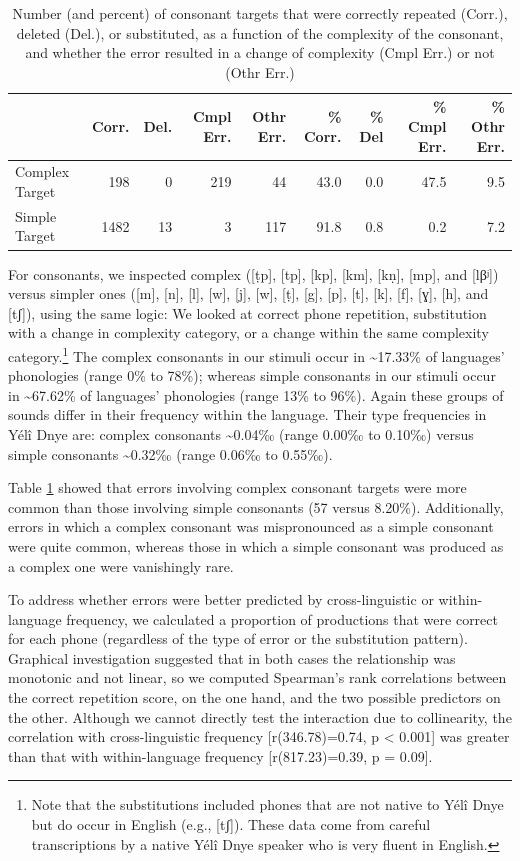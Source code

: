 \documentclass[
  american,
  ,man,floatsintext]{apa6}
\begin{document}
\begin{table}

\caption{\label{tab:tab-c}Number (and percent) of consonant targets that were correctly repeated (Corr.), deleted (Del.), or substituted, as a function of the complexity of the consonant, and whether the error resulted in a change of complexity (Cmpl Err.) or not (Othr Err.)}
\centering
\begin{tabular}[t]{lrrrrrrrr}
\toprule
  & Corr. & Del. & Cmpl Err. & Othr Err. & \% Corr. & \% Del & \% Cmpl Err. & \% Othr Err.\\
\midrule
Complex Target & 198 & 0 & 219 & 44 & 43.0 & 0.0 & 47.5 & 9.5\\
Simple Target & 1482 & 13 & 3 & 117 & 91.8 & 0.8 & 0.2 & 7.2\\
\bottomrule
\end{tabular}
\end{table}

For consonants, we inspected complex ({[}ṭp{]}, {[}tp{]}, {[}kp{]}, {[}km{]}, {[}kṇ{]}, {[}mp{]}, and {[}lβʲ{]}) versus simpler ones ({[}m{]}, {[}n{]}, {[}l{]}, {[}w{]}, {[}j{]}, {[}w{]}, {[}ṭ{]}, {[}g{]}, {[}p{]}, {[}t{]}, {[}k{]}, {[}f{]}, {[}ɣ{]}, {[}h{]}, and {[}tʃ{]}), using the same logic: We looked at correct phone repetition, substitution with a change in complexity category, or a change within the same complexity category.\footnote{Note that the substitutions included phones that are not native to Yélî Dnye but do occur in English (e.g., {[}tʃ{]}). These data come from careful transcriptions by a native Yélî Dnye speaker who is very fluent in English.}
The complex consonants in our stimuli occur in \textasciitilde17.33\% of languages' phonologies (range 0\% to 78\%);
whereas simple consonants in our stimuli occur in \textasciitilde67.62\% of languages' phonologies (range 13\% to 96\%).
Again these groups of sounds differ in their frequency within the language. Their type frequencies in Yélî Dnye are: complex consonants \textasciitilde0.04‰ (range 0.00‰ to 0.10‰) versus simple consonants \textasciitilde0.32‰ (range 0.06‰ to 0.55‰).

Table \ref{tab:tab-c} showed that errors involving complex consonant targets were more common than those involving simple consonants (57 versus 8.20\%). Additionally, errors in which a complex consonant was mispronounced as a simple consonant were quite common, whereas those in which a simple consonant was produced as a complex one were vanishingly rare.

To address whether errors were better predicted by cross-linguistic or within-language frequency, we calculated a proportion of productions that were correct for each phone (regardless of the type of error or the substitution pattern). Graphical investigation suggested that in both cases the relationship was monotonic and not linear, so we computed Spearman's rank correlations between the correct repetition score, on the one hand, and the two possible predictors on the other. Although we cannot directly test the interaction due to collinearity, the correlation with cross-linguistic frequency {[}r(346.78)=0.74, p \textless{} 0.001{]} was greater than that with within-language frequency {[}r(817.23)=0.39, p = 0.09{]}.
\end{document}
